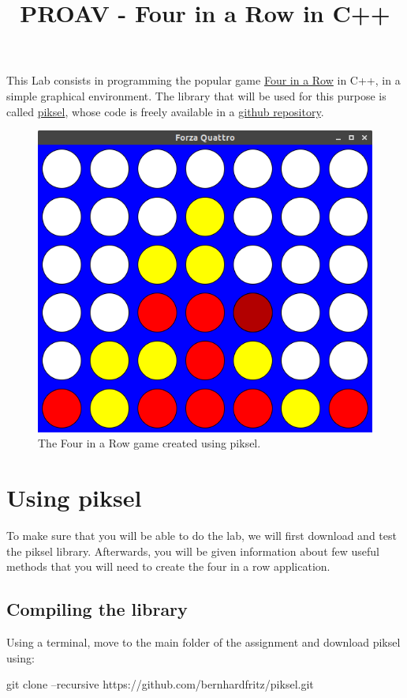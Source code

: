 \documentclass{article}
\title{PROAV - Four in a Row in C++}
\date{}
\begin{document}
  
\maketitle


This Lab consists in programming the popular game \href{https://en.wikipedia.org/wiki/Connect_Four}{Four in a Row} in C++, in a simple graphical environment. The library that will be used for this purpose is called \href{https://bernhardfritz.github.io/piksel/}{piksel}, whose code is freely available in a \href{https://github.com/bernhardfritz/piksel}{github repository}.

\begin{figure}[htbp]
  \centering
  \includegraphics[width=.55\textwidth]{f4}
  \caption{The Four in a Row game created using piksel.}
\end{figure}

\section{Using piksel}

To make sure that you will be able to do the lab, we will first download and test the piksel library. Afterwards, you will be given information about few useful methods that you will need to create the four in a row application.

\subsection{Compiling the library}

Using a terminal, move to the main folder of the assignment and download piksel using:

\begin{center}
\ttfamily
git clone --recursive https://github.com/bernhardfritz/piksel.git
\end{center}
\end{document}
